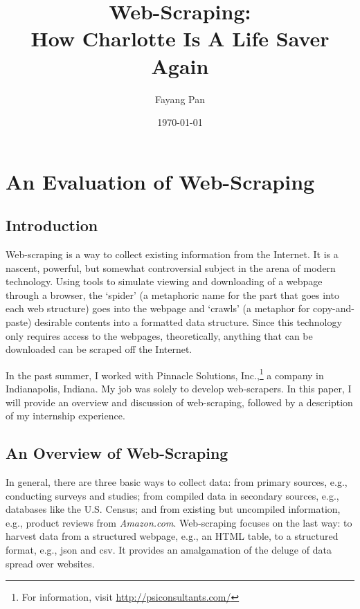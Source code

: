 \documentclass[12pt]{report}
\begin{document}
\lstset{language=Python,
basicstyle=\ttfamily,
commentstyle=\textit,
breaklines=true,
numbersep=5pt,
xleftmargin=.25in,
xrightmargin=.25in,
columns=fullflexible,
showstringspaces=false}
\title{Web-Scraping:\\ How Charlotte Is A Life Saver Again}
\author{Fayang Pan}
\date{\today}
\maketitle
\tableofcontents
\listoffigures

\chapter{An Evaluation of Web-Scraping}
\section*{Introduction}

\indent Web-scraping is a way to collect existing information from the Internet. It is a nascent, powerful, but somewhat controversial subject in the arena of modern technology. Using tools to simulate viewing and downloading of a webpage through a browser, the `spider' (a metaphoric name for the part that goes into each web structure) goes into the webpage and `crawls' (a metaphor for copy-and-paste) desirable contents into a formatted data structure. Since this technology only requires access to the webpages, theoretically, anything that can be downloaded can be scraped off the Internet.

In the past summer, I worked with Pinnacle Solutions, Inc.,\footnote{For information, visit \url{http://psiconsultants.com/}} a company in Indianapolis, Indiana. My job was solely to develop web-scrapers. In this paper, I will provide an overview and discussion of web-scraping, followed by a description of my internship experience.

\section{An Overview of Web-Scraping}
In general, there are three basic ways to collect data: from primary sources, e.g., conducting surveys and studies; from compiled data in secondary sources, e.g., databases like the U.S. Census; and from existing but uncompiled information, e.g., product reviews from \textit{Amazon.com}. Web-scraping focuses on the last way: to \gls{harvest} data from a structured webpage, e.g., an HTML table, to a structured format, e.g., \gls{json} and \gls{csv}. It provides an amalgamation of the deluge of data spread over websites.
\end{document}
